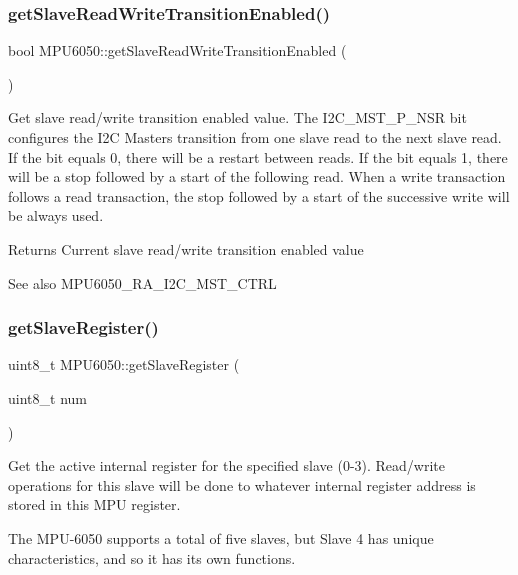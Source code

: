\subsubsection{\texorpdfstring{getSlaveReadWriteTransitionEnabled()}{getSlaveReadWriteTransitionEnabled()}}
{\footnotesize\ttfamily bool M\+P\+U6050\+::get\+Slave\+Read\+Write\+Transition\+Enabled (\begin{DoxyParamCaption}{ }\end{DoxyParamCaption})}

Get slave read/write transition enabled value. The I2\+C\+\_\+\+M\+S\+T\+\_\+\+P\+\_\+\+N\+SR bit configures the I2C Master\textquotesingle{}s transition from one slave read to the next slave read. If the bit equals 0, there will be a restart between reads. If the bit equals 1, there will be a stop followed by a start of the following read. When a write transaction follows a read transaction, the stop followed by a start of the successive write will be always used.

\begin{DoxyReturn}{Returns}
Current slave read/write transition enabled value 
\end{DoxyReturn}
\begin{DoxySeeAlso}{See also}
M\+P\+U6050\+\_\+\+R\+A\+\_\+\+I2\+C\+\_\+\+M\+S\+T\+\_\+\+C\+T\+RL 
\end{DoxySeeAlso}
\mbox{\label{class_m_p_u6050_ae7e9ead9645bcef326eb579c6ab5d5ff}} 
\subsubsection{\texorpdfstring{getSlaveRegister()}{getSlaveRegister()}}
{\footnotesize\ttfamily uint8\+\_\+t M\+P\+U6050\+::get\+Slave\+Register (\begin{DoxyParamCaption}\item[{uint8\+\_\+t}]{num }\end{DoxyParamCaption})}

Get the active internal register for the specified slave (0-\/3). Read/write operations for this slave will be done to whatever internal register address is stored in this M\+PU register.

The M\+P\+U-\/6050 supports a total of five slaves, but Slave 4 has unique characteristics, and so it has its own functions.


